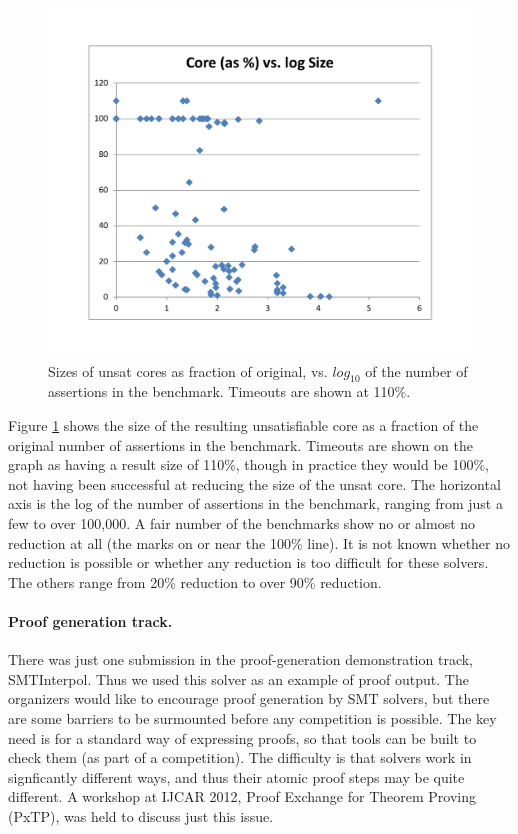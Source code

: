 \documentclass{llncs}
\begin{document}
\begin{figure}[t]
\centering
\includegraphics[width=\textwidth]{SMTCOMP-Core2.pdf}
\caption{Sizes of unsat cores as fraction of original, vs. $log_{10}$ of the number of assertions in the benchmark. Timeouts are shown at 110\%.}
\label{Fig:cores}
\end{figure}

Figure \ref{Fig:cores} shows the size of the resulting unsatisfiable core as a fraction of the original number of assertions in the benchmark. Timeouts are shown on the graph as having a result size of 110\%, though in practice they would be 100\%, not having been successful at reducing the size of the unsat core. The horizontal axis is the log of the number of assertions in the benchmark, ranging from just a few to over 100,000. A fair number of the benchmarks show no or almost no reduction at all (the marks on or near the 100\% line). It is not known whether no reduction is possible or whether any reduction is too difficult for these solvers. The others range from 20\% reduction to over 90\% reduction.

\paragraph{Proof generation track.} There was just one submission in the proof-generation demonstration track, SMTInterpol. Thus we used this solver as an example of proof output. The organizers would like to encourage proof generation by SMT solvers, but there are some barriers to be surmounted before any competition is possible. The key need is for a standard way of expressing proofs, so that tools can be built to check them (as part of a competition). The difficulty is that solvers work in signficantly different ways, and thus their atomic proof steps may be quite different. A workshop at IJCAR 2012, Proof Exchange for Theorem Proving (PxTP), was held to discuss just this issue.
\end{document}
